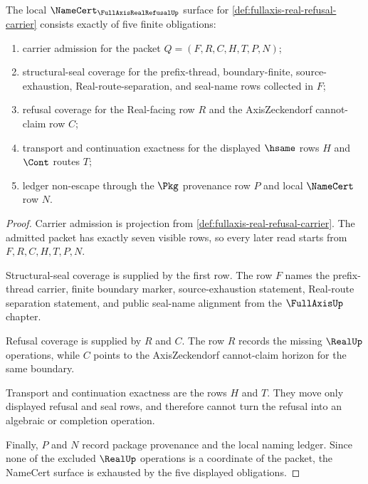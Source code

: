 \begin{theorem}
\label{thm:fullaxis-real-refusal-namecert-obligations}
The local $\NameCert_{\FullAxisRealRefusalUp}$ surface for \autoref{def:fullaxis-real-refusal-carrier} consists exactly of five finite obligations:
\begin{enumerate}
\item carrier admission for the packet $Q=(F,R,C,H,T,P,N)$;
\item structural-seal coverage for the prefix-thread, boundary-finite, source-exhaustion, Real-route-separation, and seal-name rows collected in $F$;
\item refusal coverage for the Real-facing row $R$ and the AxisZeckendorf cannot-claim row $C$;
\item transport and continuation exactness for the displayed $\hsame$ rows $H$ and $\Cont$ routes $T$;
\item ledger non-escape through the $\Pkg$ provenance row $P$ and local $\NameCert$ row $N$.
\end{enumerate}
\end{theorem}
\begin{proof}
Carrier admission is projection from \autoref{def:fullaxis-real-refusal-carrier}. The admitted packet has exactly seven visible rows, so every later read starts from $F,R,C,H,T,P,N$.

Structural-seal coverage is supplied by the first row. The row $F$ names the prefix-thread carrier, finite boundary marker, source-exhaustion statement, Real-route separation statement, and public seal-name alignment from the $\FullAxisUp$ chapter.

Refusal coverage is supplied by $R$ and $C$. The row $R$ records the missing $\RealUp$ operations, while $C$ points to the AxisZeckendorf cannot-claim horizon for the same boundary.

Transport and continuation exactness are the rows $H$ and $T$. They move only displayed refusal and seal rows, and therefore cannot turn the refusal into an algebraic or completion operation.

Finally, $P$ and $N$ record package provenance and the local naming ledger. Since none of the excluded $\RealUp$ operations is a coordinate of the packet, the NameCert surface is exhausted by the five displayed obligations.
\end{proof}

